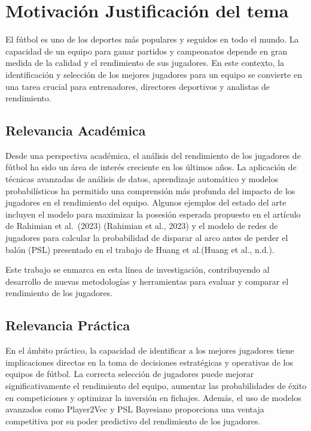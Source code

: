 \documentclass[
  a4paper,
]{article}
\begin{document}
\hypertarget{motivaciuxf3n-justificaciuxf3n-del-tema}{%
\section{\texorpdfstring{\textbf{Motivación Justificación del
tema}}{Motivación Justificación del tema}}\label{motivaciuxf3n-justificaciuxf3n-del-tema}}

El fútbol es uno de los deportes más populares y seguidos en todo el
mundo. La capacidad de un equipo para ganar partidos y campeonatos
depende en gran medida de la calidad y el rendimiento de sus jugadores.
En este contexto, la identificación y selección de los mejores jugadores
para un equipo se convierte en una tarea crucial para entrenadores,
directores deportivos y analistas de rendimiento.

\hypertarget{relevancia-acaduxe9mica}{%
\subsection{Relevancia Académica}\label{relevancia-acaduxe9mica}}

Desde una perspectiva académica, el análisis del rendimiento de los
jugadores de fútbol ha sido un área de interés creciente en los últimos
años. La aplicación de técnicas avanzadas de análisis de datos,
aprendizaje automático y modelos probabilísticos ha permitido una
comprensión más profunda del impacto de los jugadores en el rendimiento
del equipo. Algunos ejemplos del estado del arte incluyen el modelo para
maximizar la posesión esperada propuesto en el artículo de Rahimian et
al.~(2023) (Rahimian et al., 2023) y el modelo de redes de jugadores
para calcular la probabilidad de disparar al arco antes de perder el
balón (PSL) presentado en el trabajo de Huang et al.(Huang et al.,
n.d.).

Este trabajo se enmarca en esta línea de investigación, contribuyendo al
desarrollo de nuevas metodologías y herramientas para evaluar y comparar
el rendimiento de los jugadores.

\hypertarget{relevancia-pruxe1ctica}{%
\subsection{Relevancia Práctica}\label{relevancia-pruxe1ctica}}

En el ámbito práctico, la capacidad de identificar a los mejores
jugadores tiene implicaciones directas en la toma de decisiones
estratégicas y operativas de los equipos de fútbol. La correcta
selección de jugadores puede mejorar significativamente el rendimiento
del equipo, aumentar las probabilidades de éxito en competiciones y
optimizar la inversión en fichajes. Además, el uso de modelos avanzados
como Player2Vec y PSL Bayesiano proporciona una ventaja competitiva por
su poder predictivo del rendimiento de los jugadores.
\end{document}
